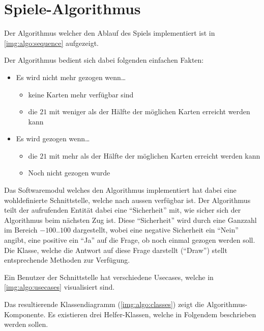 \chapter{Spiele-Algorithmus}

    Der Algorithmus welcher den Ablauf des Spiels implementiert ist in
    \autoref{img:algo:sequence} aufgezeigt.

    Der Algorithmus bedient sich dabei folgenden einfachen Fakten:

    \begin{itemize}
        \item Es wird nicht mehr gezogen wenn\dots
            \begin{itemize}
                \item keine Karten mehr verfügbar sind
                \item die $21$ mit weniger als der Hälfte der möglichen Karten
                    erreicht werden kann
            \end{itemize}
        \item Es wird gezogen wenn\dots
            \begin{itemize}
                \item die $21$ mit mehr als der Hälfte der möglichen Karten
                    erreicht werden kann
                \item Noch nicht gezogen wurde
            \end{itemize}
    \end{itemize}

    Das Softwaremodul welches den Algorithmus implementiert hat dabei eine
    wohldefinierte Schnittstelle, welche nach aussen verfügbar ist.
    Der Algorithmus teilt der aufrufenden Entität dabei eine ``Sicherheit'' mit,
    wie sicher sich der Algorithmus beim nächsten Zug ist.
    Diese ``Sicherheit'' wird durch eine Ganzzahl im Bereich $-100..100$
    dargestellt, wobei eine negative Sicherheit ein ``Nein'' angibt, eine
    positive ein ``Ja'' auf die Frage, ob noch einmal gezogen werden soll.
    Die Klasse, welche die Antwort auf diese Frage darstellt (``Draw'') stellt
    entsprechende Methoden zur Verfügung.

    Ein Benutzer der Schnittstelle hat verschiedene Usecases, welche in
    \autoref{img:algo:usecases} visualisiert sind.

    Das resultierende Klassendiagramm (\autoref{img:algo:classes}) zeigt die
    Algorithmus-Komponente.
    Es existieren drei Helfer-Klassen, welche in Folgendem beschrieben werden
    sollen.

